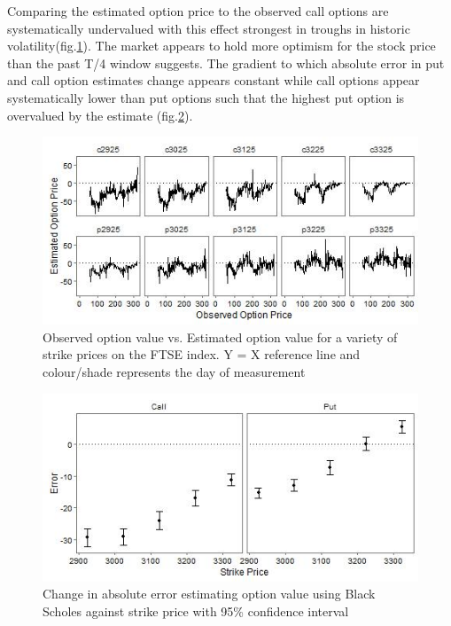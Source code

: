 \documentclass{sig-alternate-05-2015}
\begin{document}
Comparing the estimated option price to the observed call options are systematically undervalued with this effect strongest in troughs in historic volatility(fig.\ref{fig:Q2_2}). The market appears to hold more optimism for the stock price than the past T/4 window suggests. The gradient to which absolute error in put and call option estimates change appears constant while call options appear systematically lower than put options such that the highest put option is overvalued by the estimate (fig.\ref{fig:Q2_3}). 

\begin{figure}[b]
	\includegraphics[width=\linewidth]{../Plots/Q2_2.jpg}
	\centering
	\caption{Observed option value vs. Estimated option value for a variety of strike prices on the FTSE index. Y = X reference line and colour/shade represents the day of measurement}
			\label{fig:Q2_2}
\end{figure}

\begin{figure}[b]
	\includegraphics[width=\linewidth]{../Plots/Q2_3.jpg}
	\centering
	\caption{Change in absolute error estimating option value using Black Scholes against strike price with 95\% confidence interval}
			\label{fig:Q2_3}
\end{figure}
\end{document}
